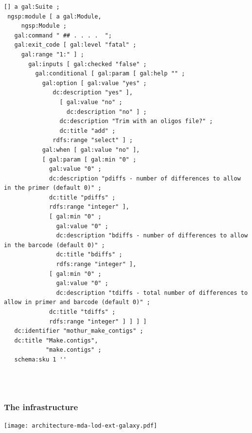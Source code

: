 \documentclass[10pt]{beamer}
\begin{document}
\begin{frame}[fragile]
\begin{columns}[T]
\begin{column}{0.5\linewidth}
\begin{verbatim}
[] a gal:Suite ;
 ngsp:module [ a gal:Module,
     ngsp:Module ;
   gal:command " ## . . . .  ";
   gal:exit_code [ gal:level "fatal" ;
     gal:range "1:" ] ;
       gal:inputs [ gal:checked "false" ;
         gal:conditional [ gal:param [ gal:help "" ;
           gal:option [ gal:value "yes" ;
              dc:description "yes" ],
                [ gal:value "no" ;
                  dc:description "no" ] ;
                dc:description "Trim with an oligos file?" ;
                dc:title "add" ;
              rdfs:range "select" ] ;
           gal:when [ gal:value "no" ],
           [ gal:param [ gal:min "0" ;
             gal:value "0" ;
             dc:description "pdiffs - number of differences to allow in the primer (default 0)" ;
             dc:title "pdiffs" ;
             rdfs:range "integer" ],
             [ gal:min "0" ;
               gal:value "0" ;
               dc:description "bdiffs - number of differences to allow in the barcode (default 0)" ;
               dc:title "bdiffs" ;
               rdfs:range "integer" ],
             [ gal:min "0" ;
               gal:value "0" ;
               dc:description "tdiffs - total number of differences to allow in primer and barcode (default 0)" ;
             dc:title "tdiffs" ;
             rdfs:range "integer" ] ] ] ]
   dc:identifier "mothur_make_contigs" ;
   dc:title "Make.contigs",
            "make.contigs" ;
   schema:sku 1 ''



\end{verbatim}
    \end{column}
  \end{columns}
\end{frame}

\begin{frame}
  \frametitle{The infrastructure}
  \centering
  \texttt{[image: architecture-mda-lod-ext-galaxy.pdf]}
\end{frame}
\end{document}
